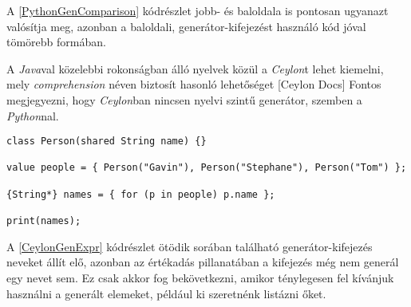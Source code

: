 A \ref{PythonGenComparison} kódrészlet jobb- és baloldala is pontosan ugyanazt valósítja meg, azonban a baloldali, generátor-kifejezést használó kód jóval tömörebb formában.

A \textit{Java}val közelebbi rokonságban álló nyelvek közül a \textit{Ceylon}t lehet kiemelni, mely \textit{comprehension} néven biztosít hasonló lehetőséget [Ceylon Docs] Fontos megjegyezni, hogy \textit{Ceylon}ban nincsen nyelvi szintű generátor, szemben a \textit{Python}nal.

\begin{lstlisting}[language=Ceylon, caption={Nevek kilistázása generátor-kifejezéssel Ceylonban}, captionpos=b, label=CeylonGenExpr]
class Person(shared String name) {}

value people = { Person("Gavin"), Person("Stephane"), Person("Tom") };
          
{String*} names = { for (p in people) p.name };
          
print(names);
\end{lstlisting}

A \ref{CeylonGenExpr} kódrészlet ötödik sorában található generátor-kifejezés neveket állít elő, azonban az értékadás pillanatában a kifejezés még nem generál egy nevet sem. Ez csak akkor fog bekövetkezni, amikor ténylegesen fel kívánjuk használni a generált elemeket, például ki szeretnénk listázni őket. 